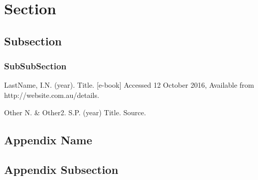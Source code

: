 \documentclass[11pt, a4paper]{article}
\begin{document}
\newpage
{} %

\section{Section} \label{sec: Section}

    \subsection{Subsection} \label{ssec: Subsection}
    
    		\subsubsection{SubSubSection} \label{sssec: SubSubSection}
     

\newpage
\begin{thebibliography}{2}
     LastName, I.N. (year). Title. [e-book] Accessed 12 October 2016, Available from http://website.com.au/details.
    
     Other N. \& Other2. S.P. (year) Title. Source.
\end{thebibliography}

\newpage
\begin{appendix}

\section{Appendix Name} \label{a: Appendix Name}
    
    \subsection{Appendix Subsection} \label{as: Appendix Subsection}
        
        
\end{appendix}
\end{document}
